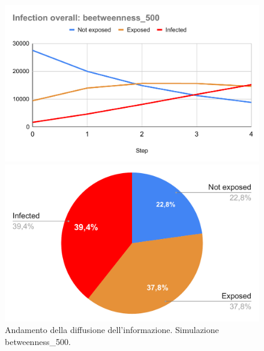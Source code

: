             \begin{figure}[H]
                \centering
                \begin{minipage}[c]{0.55\textwidth}
                    \includegraphics[width=\textwidth]{resources/charts/Infection overall_ beetweenness_500.pdf}
                \end{minipage}
                \hfill
                \begin{minipage}[c]{0.44\textwidth}
                    \includegraphics[width=\textwidth]{resources/charts/pie_btw_500.pdf}
                \end{minipage}
                \caption{Andamento della diffusione dell'informazione. Simulazione betweenness\_500.}
            \end{figure}
            

